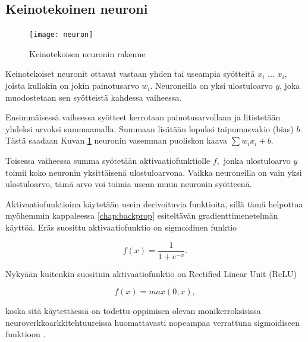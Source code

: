 \documentclass[finnish]{tktltiki2}
\theoremstyle{definition}
\theoremstyle{remark}
\begin{document}
  \subsection{Keinotekoinen neuroni}
    \label{chap:artificial-neuron}

    \begin{figure}[h]
      \centering
      \texttt{[image: neuron]}
      \caption{Keinotekoisen neuronin rakenne}
      \label{pic:neuron}
    \end{figure}

    Keinotekoiset neuronit ottavat vastaan yhden tai useampia syötteitä $x_i$ ... $x_i$, joista kullakin on jokin painotusarvo $w_i$. Neuroneilla on yksi ulostuloarvo $y$, joka muodostetaan sen syötteistä kahdessa vaiheessa.

    Ensimmäisessä vaiheessa syötteet kerrotaan painotusarvollaan ja litistetään yhdeksi arvoksi summaamalla. Summaan lisätään lopuksi taipumusvakio (bias) $b$. Tästä saadaan Kuvan \ref{pic:neuron} neuronin vasemman puoliskon kaava $\sum w_i x_i + b$.

    Toisessa vaiheessa summa syötetään aktivaatiofunktiolle $f$, jonka ulostuloarvo $y$ toimii koko neuronin yksittäisenä ulostuloarvona. Vaikka neuroneilla on vain yksi ulostuloarvo, tämä arvo voi toimia usean muun neuronin syötteenä.

    Aktivaatiofunktioina käytetään usein derivoituvia funktioita, sillä tämä helpottaa myöhemmin kappaleessa \ref{chap:backprop} esiteltävän gradienttimenetelmän käyttöä. Eräs suosittu aktivaatiofunktio on sigmoidinen funktio

    \begin{equation}
      f(x) = \frac{1}{1 + e^{-x}}.
      \label{eq:sigmoid-func}
    \end{equation}

    \noindent Nykyään kuitenkin suosituin aktivaatiofunktio on Rectified Linear Unit (ReLU)

    \begin{equation}
      f(x) = max(0, x),
      \label{eq:relu-func}
    \end{equation}

    \noindent koska sitä käytettäessä on todettu oppimisen olevan monikerroksisissa neuroverkkoarkkitehtuureissa huomattavasti nopeampaa verrattuna sigmoidiseen funktioon \cite{nature-lecun15}.
\end{document}
